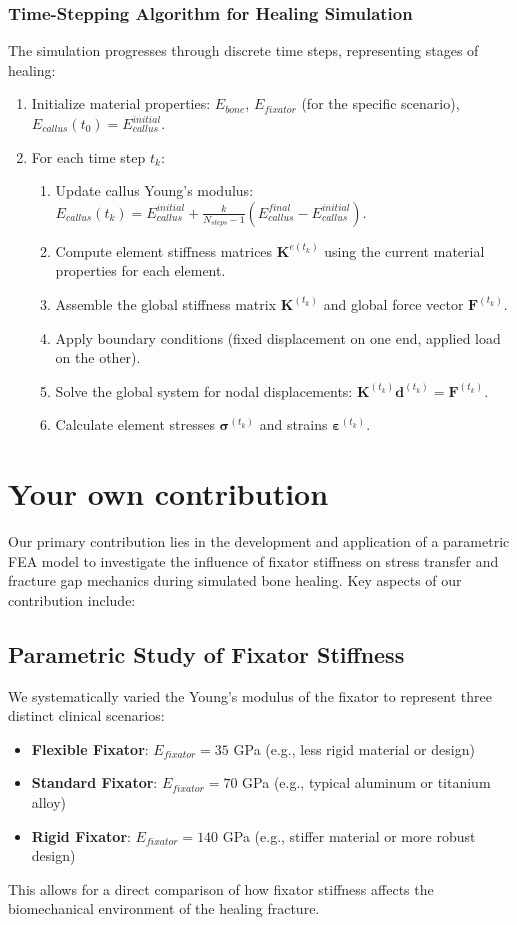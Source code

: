 \documentclass{article}
\begin{document}
\subsubsection{Time-Stepping Algorithm for Healing Simulation}
The simulation progresses through discrete time steps, representing stages of healing:
\begin{enumerate}
  \item Initialize material properties: $E_{bone}$, $E_{fixator}$ (for the specific scenario), $E_{callus}(t_0) = E_{callus}^{initial}$.
  \item For each time step $t_k$:
        \begin{enumerate}
          \item Update callus Young's modulus: $E_{callus}(t_k) = E_{callus}^{initial} + \frac{k}{N_{steps}-1}(E_{callus}^{final} - E_{callus}^{initial})$.
          \item Compute element stiffness matrices $\mathbf{K}^{e(t_k)}$ using the current material properties for each element.
          \item Assemble the global stiffness matrix $\mathbf{K}^{(t_k)}$ and global force vector $\mathbf{F}^{(t_k)}$.
          \item Apply boundary conditions (fixed displacement on one end, applied load on the other).
          \item Solve the global system for nodal displacements: $\mathbf{K}^{(t_k)}\mathbf{d}^{(t_k)} = \mathbf{F}^{(t_k)}$.
          \item Calculate element stresses $\bm{\sigma}^{(t_k)}$ and strains $\bm{\varepsilon}^{(t_k)}$.
        \end{enumerate}
\end{enumerate}

\section{Your own contribution}

Our primary contribution lies in the development and application of a parametric FEA model to investigate the influence of fixator stiffness on stress transfer and fracture gap mechanics during simulated bone healing. Key aspects of our contribution include:

\subsection{Parametric Study of Fixator Stiffness}
We systematically varied the Young's modulus of the fixator to represent three distinct clinical scenarios:
\begin{itemize}
  \item \textbf{Flexible Fixator}: $E_{fixator} = 35$ GPa (e.g., less rigid material or design)
  \item \textbf{Standard Fixator}: $E_{fixator} = 70$ GPa (e.g., typical aluminum or titanium alloy)
  \item \textbf{Rigid Fixator}: $E_{fixator} = 140$ GPa (e.g., stiffer material or more robust design)
\end{itemize}
This allows for a direct comparison of how fixator stiffness affects the biomechanical environment of the healing fracture.
\end{document}
